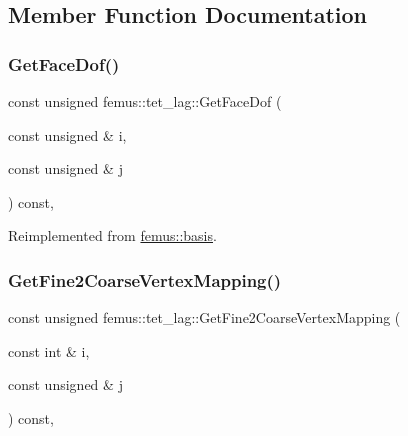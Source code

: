 \subsection{Member Function Documentation}
\mbox{\label{classfemus_1_1tet__lag_a1d112ec062067cef9672bd1a3e726a5e}} 
\subsubsection{\texorpdfstring{Get\+Face\+Dof()}{GetFaceDof()}}
{\footnotesize\ttfamily const unsigned femus\+::tet\+\_\+lag\+::\+Get\+Face\+Dof (\begin{DoxyParamCaption}\item[{const unsigned \&}]{i,  }\item[{const unsigned \&}]{j }\end{DoxyParamCaption}) const\hspace{0.3cm}{\ttfamily [inline]}, {\ttfamily [virtual]}}



Reimplemented from \mbox{\hyperlink{classfemus_1_1basis_a06f93864b6ce0925d41bf08173dc2500}{femus\+::basis}}.

\mbox{\label{classfemus_1_1tet__lag_a92607e302e1bf2526b2750295950f116}} 
\subsubsection{\texorpdfstring{Get\+Fine2\+Coarse\+Vertex\+Mapping()}{GetFine2CoarseVertexMapping()}}
{\footnotesize\ttfamily const unsigned femus\+::tet\+\_\+lag\+::\+Get\+Fine2\+Coarse\+Vertex\+Mapping (\begin{DoxyParamCaption}\item[{const int \&}]{i,  }\item[{const unsigned \&}]{j }\end{DoxyParamCaption}) const\hspace{0.3cm}{\ttfamily [inline]}, {\ttfamily [virtual]}}



